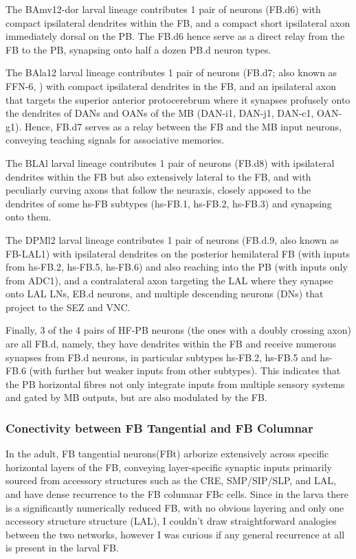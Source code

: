             The BAmv12-dor larval lineage contributes 1 pair of neurons (FB.d6) with compact ipsilateral dendrites within the FB, and a compact short ipsilateral axon immediately dorsal on the PB. The FB.d6 hence serve as a direct relay from the FB to the PB, synapsing onto half a dozen PB.d neuron types.

            The BAla12 larval lineage contributes 1 pair of neurons (FB.d7; also known as FFN-6, \citep{eschbach2021circuits}) with compact ipsilateral dendrites in the FB, and an ipsilateral axon that targets the superior anterior protocerebrum where it synapses profusely onto the dendrites of DANs and OANs of the MB (DAN-i1, DAN-j1, DAN-c1, OAN-g1). Hence, FB.d7 serves as a relay between the FB and the MB input neurons, conveying teaching signals for associative memories.

            The BLAl larval lineage contributes 1 pair of neurons (FB.d8) with ipsilateral dendrites within the FB but also extensively lateral to the FB, and with peculiarly curving axons that follow the neuraxis, closely apposed to the dendrites of some hs-FB subtypes (hs-FB.1, hs-FB.2, hs-FB.3) and synapsing onto them.

            The DPMl2 larval lineage contributes 1 pair of neurons (FB.d.9, also known as FB-LAL1) with ipsilateral dendrites on the posterior  hemilateral FB (with inputs from hs-FB.2, hs-FB.5, hs-FB.6) and also reaching into the PB (with inputs only from ADC1), and a contralateral axon targeting the LAL where they synapse onto LAL LNs, EB.d neurons, and multiple descending neurons (DNs) that project to the SEZ and VNC.

            Finally, 3 of the 4 pairs of HF-PB neurons (the ones with a doubly crossing axon) are all FB.d, namely, they have dendrites within the FB and receive numerous synapses from FB.d neurons, in particular subtypes hs-FB.2, hs-FB.5 and hs-FB.6 (with further but weaker inputs from other subtypes). This indicates that the PB horizontal fibres not only integrate inputs from multiple sensory systems and gated by MB outputs, but are also modulated by the FB.

        \subsubsection{Conectivity between FB Tangential and FB Columnar}
           In the adult, FB tangential neurons(FBt) arborize extensively across specific horizontal layers of the FB, conveying layer-specific synaptic inputs primarily sourced from accessory structures such as the CRE, SMP/SIP/SLP, and LAL, and have dense recurrence to the FB columnar FBc cells. Since in the larva there is a significantly numerically reduced FB, with no obvious layering and only one accessory structure structure (LAL), I couldn't draw straightforward analogies between the two networks, however I was curious if any general recurrence at all is present in the larval FB.  
           
